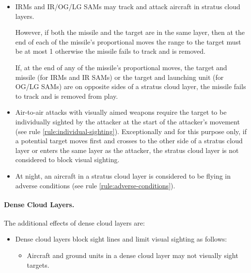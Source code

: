 \begin{advancedrules}
{\begin{itemize}
\begin{itemize}
\end{itemize}
When an aircraft in a stratus cloud layer is searching for a target in the same layer, all of these modifiers apply.

\item{} IRMs and IR/OG/LG SAMs may track and attack aircraft in stratus cloud layers. 

However, if both the missile and the target are in the same layer, then at the end of each of the missile’s proportional moves the range to the target must be at most 1 otherwise the missile fails to track and is removed. 

If, at the end of any of the missile’s proportional moves, the target and missile (for IRMs and IR SAMs) or the target and launching unit (for OG/LG SAMs) are on opposite sides of a stratus cloud layer, the missile fails to track and is removed from play.


\item{} Air-to-air attacks with visually aimed weapons require the target to be individually sighted by the attacker at the start of the attacker's movement (see rule \ref{rule:individual-sighting}). Exceptionally and for this purpose only, if a potential target moves first and crosses to the other side of a stratus cloud layer or enters the same layer as the attacker, the stratus cloud layer is not considered to block visual sighting.

\item{} At night, an aircraft in a stratus cloud layer is considered to be flying in adverse conditions (see rule \ref{rule:adverse-conditions}).

\end{itemize}

\paragraph{Dense Cloud Layers.}
\label{rule:dense-cloud-layers}

The additional effects of dense cloud layers are:

\begin{itemize}

\item{} Dense cloud layers block sight lines and limit visual sighting as follows:

\begin{itemize}
\item
Aircraft and ground units in a dense cloud layer may not visually sight targets.


\end{itemize}
\end{itemize}}
\end{advancedrules}

